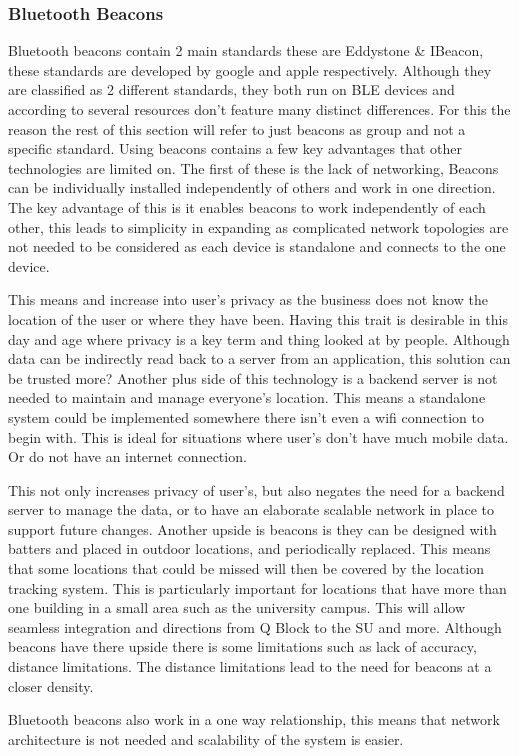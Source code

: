 \subsubsection{Bluetooth Beacons}
Bluetooth beacons contain 2 main standards these are Eddystone \& IBeacon, these standards are developed by google and apple respectively. Although they are classified as 2 different standards, they both run on BLE devices and according to several resources don’t feature many distinct differences. For this the reason the rest of this section will refer to just beacons as group and not a specific standard.
Using beacons contains a few key advantages that other technologies are limited on. The first of these is the lack of networking, Beacons can be individually installed independently of others and work in one direction. The key advantage of this is it enables beacons to work independently of each other, this leads to simplicity in expanding as complicated network topologies are not needed to be considered as each device is standalone and connects to the one device.

This means and increase into user’s privacy as the business does not know the location of the user or where they have been. Having this trait is desirable in this day and age where privacy is a key term and thing looked at by people. Although data can be indirectly read back to a server from an application, this solution can be trusted more?
Another plus side of this technology is a backend server is not needed to maintain and manage everyone’s location. This means a standalone system could be implemented somewhere there isn’t even a wifi connection to begin with. This is ideal for situations where user’s don’t have much mobile data. Or do not have an internet connection.

 This not only increases privacy of user’s, but also negates the need for a backend server to manage the data, or to have an elaborate scalable network in place to support future changes. 
Another upside is beacons is they can be designed with batters and placed in outdoor locations, and periodically replaced. This means that some locations that could be missed will then be covered by the location tracking system. This is particularly important for locations that have more than one building in a small area such as the university campus. This will allow seamless integration and directions from Q Block to the SU and more.
Although beacons have there upside there is some limitations such as lack of accuracy, distance limitations. The distance limitations lead to the need for beacons at a closer density.

Bluetooth beacons also work in a one way relationship, this means that network architecture is not needed and scalability of the system is easier.
